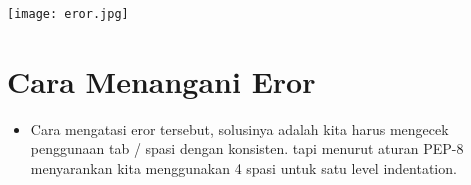 \documentclass{article}
\begin{document}
\begin{center}
    \texttt{[image: eror.jpg]}
\end{center}

\section{Cara Menangani Eror}
\usepackage{IndentationError: unindent does not match any outer indentation level}

\begin{itemize}
    \item Cara mengatasi eror tersebut, solusinya adalah kita harus mengecek penggunaan tab / spasi dengan konsisten. tapi menurut aturan PEP-8 menyarankan kita menggunakan 4 spasi untuk satu level indentation.
\end{itemize}
\end{document}
